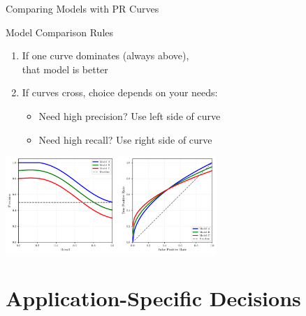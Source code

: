 \documentclass{beamer}
\begin{document}
\begin{frame}{Comparing Models with PR Curves}
\begin{alertblock}{Model Comparison Rules}
\small
\begin{enumerate}
    \item If one curve dominates (always above), \\
          that model is better

    \vspace{0.15cm}

    \item If curves cross, choice depends on your needs:
    \begin{itemize}
        \item Need high precision? Use left side of curve
        \item Need high recall? Use right side of curve
    \end{itemize}
\end{enumerate}
\end{alertblock}

\vspace{0.15cm}

\begin{center}
\includegraphics[width=0.6\textwidth]{model-comparison-diagram.pdf}
\end{center}
\end{frame}

\section{Application-Specific Decisions}
\end{document}

